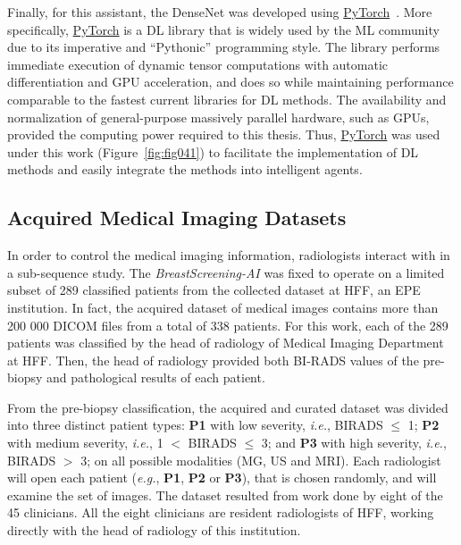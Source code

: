 Finally, for this assistant, the DenseNet was developed using \href{https://pytorch.org/}{PyTorch}~\cite{NEURIPS2019_bdbca288}.
More specifically, \href{https://pytorch.org/}{PyTorch} is a \ac{DL} library that is widely used by the \ac{ML} community due to its imperative and ``Pythonic'' programming style.
The library performs immediate execution of dynamic tensor computations with automatic differentiation and \ac{GPU} acceleration, and does so while maintaining performance comparable to the fastest current libraries for \ac{DL} methods.
The availability and normalization of general-purpose massively parallel hardware, such as \acp{GPU}, provided the computing power required to this thesis.
Thus, \href{https://pytorch.org/}{PyTorch} was used under this work  (Figure~\ref{fig:fig041}) to facilitate the implementation of \ac{DL} methods and easily integrate the methods into intelligent agents.

\subsection{Acquired Medical Imaging Datasets}
\label{sec:app003003004}

In order to control the medical imaging information, radiologists interact with in a sub-sequence study.
The {\it BreastScreening-AI} was fixed to operate on a limited subset of 289 classified patients from the collected dataset at \acf{HFF}, an \ac{EPE} institution.
In fact, the acquired dataset of medical images contains more than 200 000 \ac{DICOM} files from a total of 338 patients.
For this work, each of the 289 patients was classified by the head of radiology of Medical Imaging Department at \ac{HFF}.
Then, the head of radiology provided both \ac{BI-RADS} values of the pre-biopsy and pathological results of each patient.

From the pre-biopsy classification, the acquired and curated dataset was divided into three distinct patient types:
{\bf P1} with low severity, {\it i.e.}, BIRADS $\leq$ 1;
{\bf P2} with medium severity, {\it i.e.}, 1 $<$ BIRADS $\leq$ 3; and
{\bf P3} with high severity, {\it i.e.}, BIRADS $>$ 3;
on all possible modalities (\ac{MG}, \ac{US} and \ac{MRI}).
Each radiologist will open each patient ({\it e.g.}, {\bf P1}, {\bf P2} or {\bf P3}), that is chosen randomly, and will examine the set of images.
The dataset resulted from work done by eight of the 45 clinicians.
All the eight clinicians are resident radiologists of \acl{HFF}, working directly with the head of radiology of this institution.

